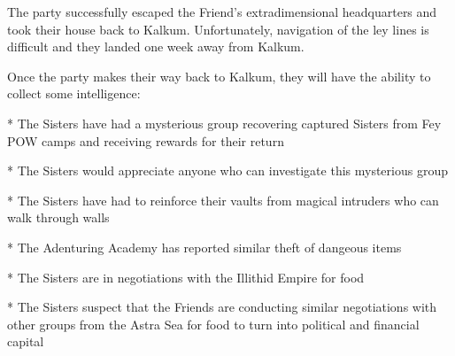 The party successfully escaped the Friend's extradimensional headquarters and took their house back to Kalkum.
Unfortunately, navigation of the ley lines is difficult and they landed one week away from Kalkum.

Once the party makes their way back to Kalkum, they will have the ability to collect some intelligence:

* The Sisters have had a mysterious group recovering captured Sisters from Fey POW camps and receiving rewards for their return

* The Sisters would appreciate anyone who can investigate this mysterious group

* The Sisters have had to reinforce their vaults from magical intruders who can walk through walls

* The Adenturing Academy has reported similar theft of dangeous items

* The Sisters are in negotiations with the Illithid Empire for food

* The Sisters suspect that the Friends are conducting similar negotiations with other groups from the Astra Sea for food to turn into political and financial capital